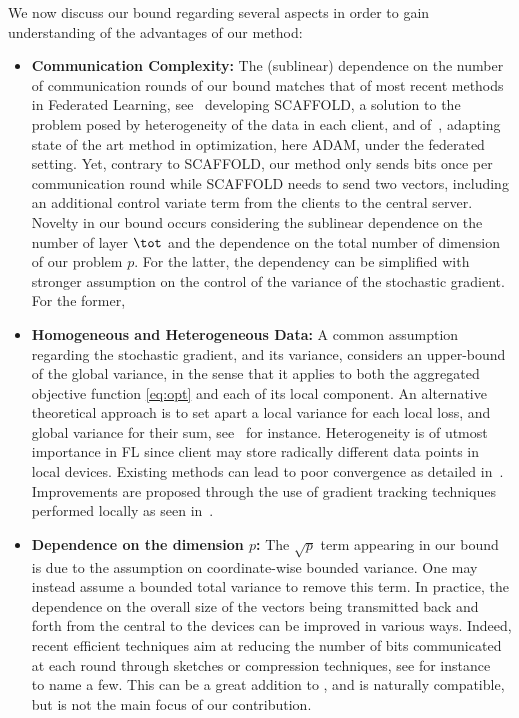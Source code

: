 \documentclass{article}
\begin{document}
We now discuss our bound regarding several aspects in order to gain understanding of the advantages of our method:
\begin{itemize}
\item \textbf{Communication Complexity:} The (sublinear) dependence on the number of communication rounds of our bound matches that of most recent methods in Federated Learning, see~\citet{karimireddy2019scaffold} developing SCAFFOLD, a solution to the problem posed by heterogeneity of the data in each client, and of~\citet{reddi2020adaptive}, adapting state of the art method in optimization, here ADAM, under the federated setting. 
Yet, contrary to SCAFFOLD, our method only sends bits once per communication round while SCAFFOLD needs to send two vectors, including an additional control variate term  from the clients to the central server.
Novelty in our bound occurs considering the sublinear dependence on the number of layer $\tot$ and the dependence on the total number of dimension of our problem $p$. For the latter, the dependency can be simplified with stronger assumption on the control of the variance of the stochastic gradient. For the former, 


\item \textbf{Homogeneous and Heterogeneous Data:} A common assumption regarding the stochastic gradient, and its variance, considers an upper-bound of the global variance, in the sense that it applies to both the aggregated objective function \eqref{eq:opt} and each of its local component. 
An alternative theoretical approach is to set apart a local variance for each local loss, and global variance for their sum, see~\citet{chen2020toward} for instance.
Heterogeneity is of utmost importance in FL since client may store radically different data points in local devices.
Existing methods can lead to poor convergence as detailed in~\citet{li2019federated,liang2019variance}. 
Improvements are proposed through the use of gradient tracking techniques performed locally as seen in~\citet{haddadpour2020federated,horvath2019stochastic,karimireddy2019scaffold}.


\item \textbf{Dependence on the dimension $p$:} The $\sqrt p$ term appearing in our bound is due to the assumption on coordinate-wise bounded variance. One may instead assume a bounded total variance to remove this term. 
In practice, the dependence on the overall size of the vectors being transmitted back and forth from the central to the devices can be improved in various ways. Indeed, recent efficient techniques aim at reducing the number of bits communicated at each round through sketches or compression techniques, see for instance~\citep{haddadpour2020fedsketch,ivkin2019communication,li2019privacy} to name a few.
This can be a great addition to \algo, and is naturally compatible, but is not the main focus of our contribution.

\end{itemize} 
\end{document}
